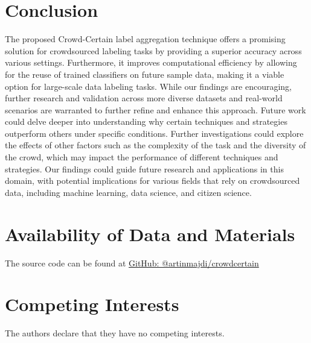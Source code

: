 \documentclass[sn-nature]{bst/sn-jnl}
\begin{document}
\section{Conclusion}\label{sec:crowd.conclusion}
The proposed Crowd-Certain label aggregation technique offers a promising solution for crowdsourced labeling tasks by providing a superior accuracy across various settings. Furthermore, it improves computational efficiency by allowing for the reuse of trained classifiers on future sample data, making it a viable option for large-scale data labeling tasks. While our findings are encouraging, further research and validation across more diverse datasets and real-world scenarios are warranted to further refine and enhance this approach. Future work could delve deeper into understanding why certain techniques and strategies outperform others under specific conditions. Further investigations could explore the effects of other factors such as the complexity of the task and the diversity of the crowd, which may impact the performance of different techniques and strategies. Our findings could guide future research and applications in this domain, with potential implications for various fields that rely on crowdsourced data, including machine learning, data science, and citizen science.
\section{Availability of Data and Materials}
The source code can be found at \href{https://github.com/artinmajdi/crowd-certain}{GitHub: @artinmajdi/crowdcertain}
\section*{Competing Interests}
The authors declare that they have no competing interests.

% 

\end{document}
